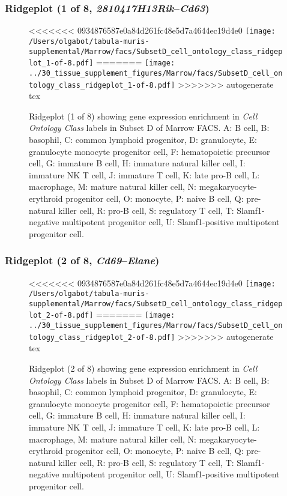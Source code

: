 \clearpage

\subsubsection{Ridgeplot (1 of 8, \emph{2810417H13Rik}--\emph{Cd63})}
\begin{figure}[h]
\centering
<<<<<<< 0934876587e0a84d261fc48e5d7a4644ec19d4e0
\texttt{[image: /Users/olgabot/tabula-muris-supplemental/Marrow/facs/SubsetD\_cell\_ontology\_class\_ridgeplot\_1-of-8.pdf]}
=======
\texttt{[image: ../30\_tissue\_supplement\_figures/Marrow/facs/SubsetD\_cell\_ontology\_class\_ridgeplot\_1-of-8.pdf]}
>>>>>>> autogenerate tex

\caption{ Ridgeplot (1 of 8)  showing gene expression enrichment in \emph{Cell Ontology Class} labels in Subset D of Marrow FACS. A: B cell, B: basophil, C: common lymphoid progenitor, D: granulocyte, E: granulocyte monocyte progenitor cell, F: hematopoietic precursor cell, G: immature B cell, H: immature natural killer cell, I: immature NK T cell, J: immature T cell, K: late pro-B cell, L: macrophage, M: mature natural killer cell, N: megakaryocyte-erythroid progenitor cell, O: monocyte, P: naive B cell, Q: pre-natural killer cell, R: pro-B cell, S: regulatory T cell, T: Slamf1-negative multipotent progenitor cell, U: Slamf1-positive multipotent progenitor cell.}
\end{figure}


\clearpage

\subsubsection{Ridgeplot (2 of 8, \emph{Cd69}--\emph{Elane})}
\begin{figure}[h]
\centering
<<<<<<< 0934876587e0a84d261fc48e5d7a4644ec19d4e0
\texttt{[image: /Users/olgabot/tabula-muris-supplemental/Marrow/facs/SubsetD\_cell\_ontology\_class\_ridgeplot\_2-of-8.pdf]}
=======
\texttt{[image: ../30\_tissue\_supplement\_figures/Marrow/facs/SubsetD\_cell\_ontology\_class\_ridgeplot\_2-of-8.pdf]}
>>>>>>> autogenerate tex

\caption{ Ridgeplot (2 of 8)  showing gene expression enrichment in \emph{Cell Ontology Class} labels in Subset D of Marrow FACS. A: B cell, B: basophil, C: common lymphoid progenitor, D: granulocyte, E: granulocyte monocyte progenitor cell, F: hematopoietic precursor cell, G: immature B cell, H: immature natural killer cell, I: immature NK T cell, J: immature T cell, K: late pro-B cell, L: macrophage, M: mature natural killer cell, N: megakaryocyte-erythroid progenitor cell, O: monocyte, P: naive B cell, Q: pre-natural killer cell, R: pro-B cell, S: regulatory T cell, T: Slamf1-negative multipotent progenitor cell, U: Slamf1-positive multipotent progenitor cell.}
\end{figure}


